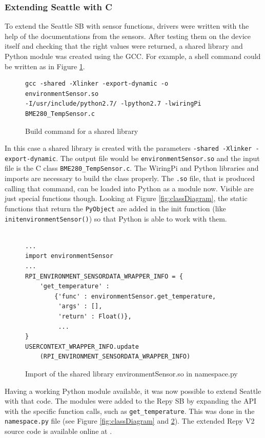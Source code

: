\documentclass{article}      %
\begin{document}
\subsubsection{Extending Seattle with C}

To extend the Seattle \gls{SB} with sensor functions, drivers were written with the help of the documentations from the sensors. After testing them on the device itself and checking that the right values were returned, a shared library and Python module was created using the \gls{GCC}. For example, a shell command could be written as in Figure \ref{fig:buildCommand}.

\begin{figure}[ht]
	\centering
	\begin{BVerbatim}
gcc -shared -Xlinker -export-dynamic -o environmentSensor.so 
-I/usr/include/python2.7/ -lpython2.7 -lwiringPi 
BME280_TempSensor.c
	\end{BVerbatim}
	\caption{Build command for a shared library}
    \label{fig:buildCommand}
\end{figure}

In this case a shared library is created with the parameters \texttt{-shared -Xlinker \mbox{-export-dynamic}}. The output file would be \texttt{environmentSensor.so} and the input file is the C class \texttt{BME280\_TempSensor.c}. The WiringPi and Python libraries and imports are necessary to build the class properly.
The \texttt{.so} file, that is produced calling that command, can be loaded into Python as a module now. Visible are just special functions though. Looking at Figure \ref{fig:classDiagram}, the static functions that return the \texttt{PyObject} are added in the init function (like \texttt{initenvironmentSensor()}) so that Python is able to work with them.

\begin{figure}[ht]
	\centering
	\begin{BVerbatim}

...
import environmentSensor
...
RPI_ENVIRONMENT_SENSORDATA_WRAPPER_INFO = {
    'get_temperature' :
        {'func' : environmentSensor.get_temperature,
         'args' : [],
         'return' : Float()},
         ...
}
USERCONTEXT_WRAPPER_INFO.update
	(RPI_ENVIRONMENT_SENSORDATA_WRAPPER_INFO)
	\end{BVerbatim}
	\caption{Import of the shared library environmentSensor.so in namespace.py}
    \label{fig:pythonLibrary}
\end{figure}

Having a working Python module available, it was now possible to extend Seattle with that code. The modules were added to the \gls{Repy} \gls{SB} by expanding the \gls{API} with the specific function calls, such as \texttt{get\_temperature}. This was done in the \texttt{namespace.py} file (see Figure \ref{fig:classDiagram} and \ref{fig:pythonLibrary}). The extended \gls{Repy} V2 source code is available online at \cite{repyFork}.
\end{document}
